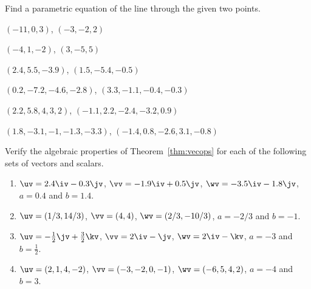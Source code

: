 \begin{exercise} \label{ex:} 
Find a parametric equation of the line through the given two points.
\begin{parts}
\item \((-11,0,3)\),
   \((-3,-2,2)\)

\item \((-4,1,-2)\),
   \((3,-5,5)\)

\item \((2.4,5.5,-3.9)\),
   \((1.5,-5.4,-0.5)\)

\item \((0.2,-7.2,-4.6,-2.8)\),
   \((3.3,-1.1,-0.4,-0.3)\)

\item \((2.2,5.8,4,3,2)\),
   \((-1.1,2.2,-2.4,-3.2,0.9)\)

\item \((1.8,-3.1,-1,-1.3,-3.3)\),
   \((-1.4,0.8,-2.6,3.1,-0.8)\)

\end{parts}
\end{exercise}



\begin{exercise} \label{ex:} 
Verify the algebraic properties of Theorem~\ref{thm:vecops} for each of the following sets of vectors and scalars.
\begin{enumerate}
\item \(\uv=2.4\iv-0.3\jv\), \(\vv=-1.9\iv+0.5\jv\), \(\wv=-3.5\iv-1.8\jv\), \(a=0.4\) and \(b=1.4\).
\item \(\uv=(1/3,14/3)\), \(\vv=(4,4)\), \(\wv=(2/3,-10/3)\), \(a=-2/3\) and \(b=-1\).
\item \(\uv=-\frac12\jv+\frac32\kv\), \(\vv=2\iv-\jv\), \(\wv=2\iv-\kv\), \(a=-3\) and \(b=\frac12\).
\item \(\uv=(2,1,4,-2)\), \(\vv=(-3,-2,0,-1)\), \(\wv=(-6,5,4,2)\), \(a=-4\) and \(b=3\).
\end{enumerate}
\end{exercise}




